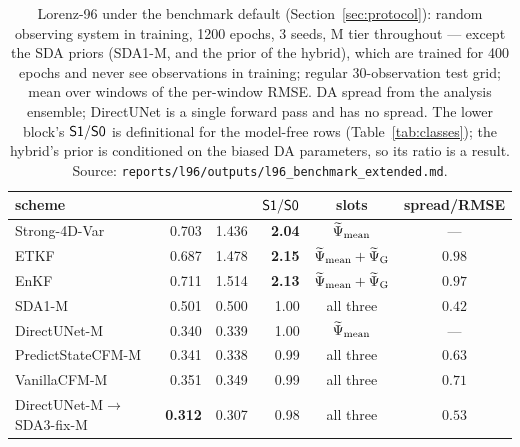\begin{table}[t]
\centering
\small
\begin{tabular}{@{}lrrrcc@{}}
\toprule
\textbf{scheme} & \textbf{\Sz{}} & \textbf{\So{}} & $\textsf{S1}/\textsf{S0}$ & \textbf{slots} & \textbf{spread/RMSE} \\
\midrule
Strong-4D-Var & 0.703 & 1.436 & \textbf{2.04} & $\widetilde{\Psi}_{\mathrm{mean}}$ & --- \\
ETKF          & 0.687 & 1.478 & \textbf{2.15} & $\widetilde{\Psi}_{\mathrm{mean}} + \widetilde{\Psi}_{\mathrm{G}}$ & $0.98$ \\
EnKF          & 0.711 & 1.514 & \textbf{2.13} & $\widetilde{\Psi}_{\mathrm{mean}} + \widetilde{\Psi}_{\mathrm{G}}$ & $0.97$ \\
\addlinespace
SDA1-M        & 0.501 & 0.500 & 1.00 & all three & $0.42$ \\
DirectUNet-M  & 0.340 & 0.339 & 1.00 & $\widetilde{\Psi}_{\mathrm{mean}}$ & --- \\
PredictStateCFM-M & 0.341 & 0.338 & 0.99 & all three & $0.63$ \\
VanillaCFM-M  & 0.351 & 0.349 & 0.99 & all three & $0.71$ \\
DirectUNet-M$\to$SDA3-fix-M & \textbf{0.312} & 0.307 & 0.98 & all three & $0.53$ \\
\bottomrule
\end{tabular}
\caption{Lorenz-96 under the benchmark default (Section~\ref{sec:protocol}):
random observing system in training, 1200 epochs, 3 seeds, M tier throughout ---
except the SDA priors (SDA1-M, and the prior of the hybrid), which are trained for
400 epochs and never see observations in training;
regular 30-observation test grid; mean over windows of the per-window RMSE.
DA spread from the analysis ensemble; DirectUNet is a single forward pass and has
no spread. The lower block's $\textsf{S1}/\textsf{S0}$ is definitional for the model-free rows
(Table~\ref{tab:classes}); the hybrid's prior is conditioned on the biased DA
parameters, so its ratio is a result. Source:
\texttt{reports/l96/outputs/l96\_benchmark\_extended.md}.}
\label{tab:price}
\end{table}


